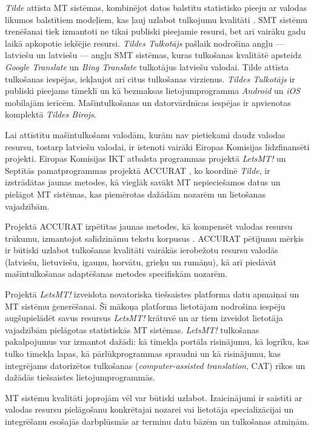\begin{multicols}{2}
\textit{Tilde} attīsta MT sistēmas, kombinējot datos balstītu statistisko pieeju ar valodas likumos balstītiem modeļiem, kas ļauj uzlabot tulkojumu kvalitāti \cite{Meta29}.  SMT sistēmu trenēšanai tiek izmantoti ne tikai publiski pieejamie resursi, bet arī vairāku gadu laikā apkopotie iekšējie \mbox{resursi}.  \textit{Tildes Tulkotājs} pašlaik nodrošina angļu --- latviešu un latviešu --- angļu SMT sistēmas, kuras tulkošanas kvalitātē apsteidz \textit{Google Translate} un \textit{Bing Translate} tulkotājus latviešu valodai.  Tilde attīsta tulkošanas iespējas, iekļaujot arī citus tulkošanas virzienus.  \textit{Tildes Tulkotājs} ir publiski pieejams tīmeklī \cite{Meta28} un kā bezmaksas lietojumprogramma \textit{Android} un \textit{iOS} mobilajām ierīcēm.  Mašīntulkošanas un datorvārdnīcas iespējas ir apvienotas komplektā \textit{Tildes Birojs}.

Lai attīstītu mašīntulkošanu valodām, kurām nav pietiekami daudz valodas resursu, tostarp latviešu valodai, ir īstenoti vairāki Eiropas Komisijas līdzfinansēti projekti.  Eiropas Komisijas IKT atbalsta programmas projektā \textit{LetsMT!} \cite{Meta30} un Septītās pamatprogrammas projektā ACCURAT \cite{Meta31}, ko koordinē \textit{Tilde}, ir izstrādātas jaunas metodes, kā vieglāk savākt MT nepieciešamos datus un pielāgot MT sistēmas, kas piemērotas dažādām nozarēm un lietošanas vajadzībām.

Projektā ACCURAT izpētītas jaunas metodes, kā kompensēt valodas resursu trūkumu, izmantojot salīdzināmu tekstu korpusus \cite{Meta32, Meta33}.  ACCURAT pētījumu mērķis ir būtiski uzlabot tulkošanas kvalitāti vairākās ierobežotu resursu valodās (latviešu, lietuviešu, igauņu, horvātu, grieķu un rumāņu), kā arī piedāvāt mašīntulkošanas adaptēšanas metodes specifiskām nozarēm.

Projektā \textit{LetsMT!} \cite{Meta34} izveidota novatoriska tiešsaistes platforma datu apmaiņai un MT sistēmu ģenerēšanai.  Šī mākoņa platforma lietotājam nodrošina iespēju augšupielādēt savus resursus \textit{LetsMT!} krātuvē un ar tiem izveidot lietotāja vajadzībām pielāgotas statistiskās MT sistēmas.
%
\textit{LetsMT!} tulkošanas pakalpojumus var izmantot dažādi: kā tīmekļa portāla risinājumu, kā logrīku, kas tulko tīmekļa lapas, kā pārlūkprogrammas spraudni un kā risinājumu, kas integrējams datorizētos tulkošanas (\textit{computer-assisted translation}, CAT) rīkos un dažādās tiešsaistes lietojumprogrammās. 

MT sistēmu kvalitāti joprojām vēl var būtiski uzlabot.
Izaicinājumi ir saistīti ar valodas resursu pielāgošanu konkrētajai nozarei vai lietotāja specializācijai un \mbox{integrēšanu} esošajās darbplūsmās ar terminu datu bāzēm un tulkošanas atmiņām. 


\end{multicols}
